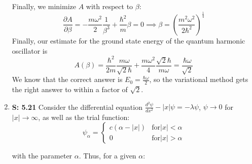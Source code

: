 \documentclass[12pt, letterpaper]{article}
\begin{document}
\begin{enumerate}
    Finally, we minimize $A$ with respect to $\beta$:
    \begin{equation}
            \frac{\partial A}{\partial \beta}=-\frac{m\omega^2}{2}\frac{1}{\beta^3}+\frac{\hbar^2}{m}\beta=0\implies \beta=\left(\frac{m^2\omega^2}{2\hbar^2}\right)^{\frac{1}{4}}
    \end{equation}
    Finally, our estimate for the ground state energy of the quantum harmonic oscillator is 
    \begin{equation}
            A(\beta)=\frac{\hbar^2}{2m}\frac{m\omega}{\sqrt{2}\hbar}+\frac{m\omega^2}{4}\frac{\sqrt{2}\hbar}{m\omega}=\boxed{\frac{\hbar \omega}{\sqrt{2}}}
    \end{equation}
    We know that the correct answer is $E_0=\frac{\hbar\omega}{2}$, so the variational method gets the right answer to within a factor of $\sqrt{2}$. 
    
    
    \item[] \textbf{S: 5.21}
    Consider the differential equation $\frac{d^2\psi}{dx^2}-|x|\psi=-\lambda\psi$, $\psi\rightarrow0$ for $|x|\rightarrow\infty$, as well as the trial function:
    \begin{equation}
            \psi_\alpha= \begin{cases} 
                     c(\alpha-|x|) & \text{for} |x|<\alpha\\
                     0             & \text{for} |x|>\alpha
                    \end{cases}
    \end{equation}
    
    with the parameter $\alpha$. Thus, for a given $\alpha$:
    

\end{enumerate}
\end{document}
